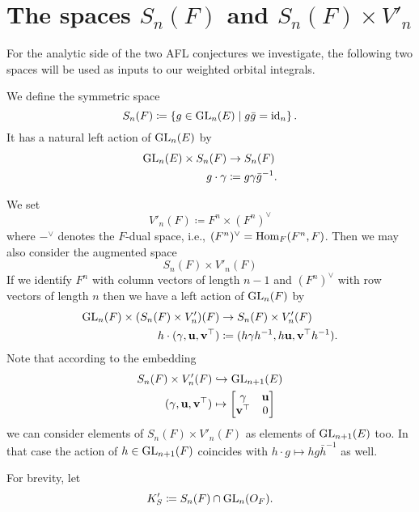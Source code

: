 \section{The spaces $S_n(F)$ and $S_n(F) \times V'_n$}
For the analytic side of the two AFL conjectures we investigate,
the following two spaces will be used as inputs to our weighted orbital integrals.
\begin{definition}
  We define the symmetric space
  \[ S_n(F) \coloneqq \left\{ g \in \operatorname{GL}_n(E) \mid g \bar g = \operatorname{id}_n \right\}. \]
  It has a natural left action of $\operatorname{GL}_n(E)$ by
  \begin{align*}
    \operatorname{GL}_n(E) \times S_n(F) &\to S_n(F) \\
    g \cdot \gamma &\coloneqq g \gamma \bar g^{-1}.
  \end{align*}
\end{definition}

\begin{definition}
  We set
  \[ V'_n(F) \coloneqq F^n \times (F^n)^\vee \]
  where $-^\vee$ denotes the $F$-dual space, i.e., $(F^n)^\vee = \operatorname{Hom}_F(F^n, F)$.
  Then we may also consider the augmented space
  \[ S_n(F) \times V'_n(F) \]
  If we identify $F^n$ with column vectors of length $n-1$ and $(F^n)^\vee$
  with row vectors of length $n$ then we have a left action of $\operatorname{GL}_n(F)$ by
  \begin{align*}
    \operatorname{GL}_n(F) \times (S_n(F) \times V'_n)(F)
    &\to S_n(F) \times V'_n(F) \\
    h \cdot (\gamma, \mathbf u, \mathbf v^\top)
    &\coloneqq (h \gamma h^{-1}, h\mathbf u, \mathbf v^\top h^{-1}).
  \end{align*}
  Note that according to the embedding
  \begin{align*}
    S_n(F) \times V'_n(F)
    &\hookrightarrow \operatorname{GL}_{n+1}(E) \\
    (\gamma, \mathbf u, \mathbf v^\top)
    &\mapsto \begin{bmatrix} \gamma & \mathbf u \\ \mathbf v^\top & 0 \end{bmatrix}
  \end{align*}
  we can consider elements of $S_n(F) \times V'_n(F)$ as elements of $\operatorname{GL}_{n+1}(E)$ too.
  In that case the action of $h \in \operatorname{GL}_{n+1}(F)$
  coincides with $h \cdot g \mapsto hg\bar{h}^{-1}$ as well.
\end{definition}

\begin{definition}
  For brevity, let
   \[ K'_S \coloneqq S_n(F) \cap \operatorname{GL}_n(O_F). \]
\end{definition}

